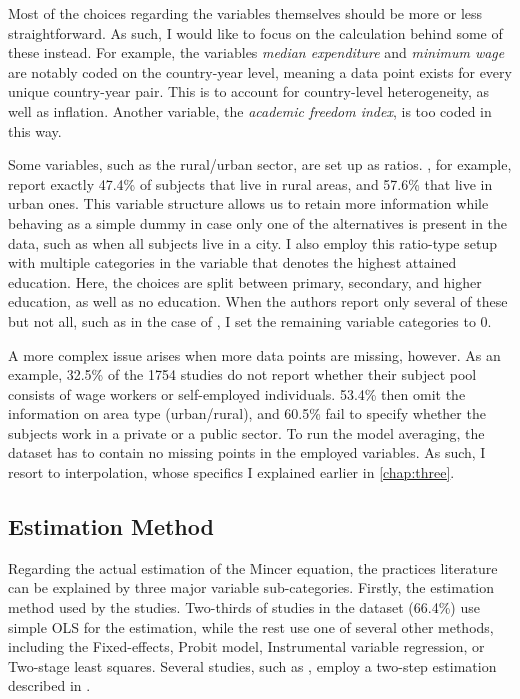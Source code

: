 Most of the choices regarding the variables themselves should be more or less straightforward. As such, I would like to focus on the calculation behind some of these instead. For example, the variables \textit{median expenditure} and \textit{minimum wage} are notably coded on the country-year level, meaning a data point exists for every unique country-year pair. This is to account for country-level heterogeneity, as well as inflation. Another variable, the \textit{academic freedom index}, is too coded in this way.

Some variables, such as the rural/urban sector, are set up as ratios. \cite{paweenawat2015private}, for example, report exactly 47.4\% of subjects that live in rural areas, and 57.6\% that live in urban ones. This variable structure allows us to retain more information while behaving as a simple dummy in case only one of the alternatives is present in the data, such as when all subjects live in a city. I also employ this ratio-type setup with multiple categories in the variable that denotes the highest attained education. Here, the choices are split between primary, secondary, and higher education, as well as no education. When the authors report only several of these but not all, such as in the case of \cite{chanis2021tell}, I set the remaining variable categories to 0.

A more complex issue arises when more data points are missing, however. As an example, 32.5\% of the 1754 studies do not report whether their subject pool consists of wage workers or self-employed individuals. 53.4\% then omit the information on area type (urban/rural), and 60.5\% fail to specify whether the subjects work in a private or a public sector. To run the model averaging, the dataset has to contain no missing points in the employed variables. As such, I resort to interpolation, whose specifics I explained earlier in \autoref{chap:three}.

\subsection{Estimation Method}
\label{subsec:estim_method}

Regarding the actual estimation of the Mincer equation, the practices literature can be explained by three major variable sub-categories. Firstly, the estimation method used by the studies. Two-thirds of studies in the dataset (66.4\%) use simple \ac{OLS} for the estimation, while the rest use one of several other methods, including the Fixed-effects, Probit model, Instrumental variable regression, or Two-stage least squares. Several studies, such as \cite{debrauw2008reconciling}, employ a two-step estimation described in \cite{heckman1974empirical}.

